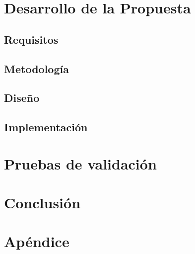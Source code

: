 \documentclass[11pt]{book}
\begin{document}
\chapter{Desarrollo de la Propuesta}

\section{Requisitos}


\section{Metodología}


\section{Diseño}


\section{Implementación}


\chapter{Pruebas de validación}


\chapter{Conclusión}


\appendix
\chapter{Apéndice}

\end{document}
